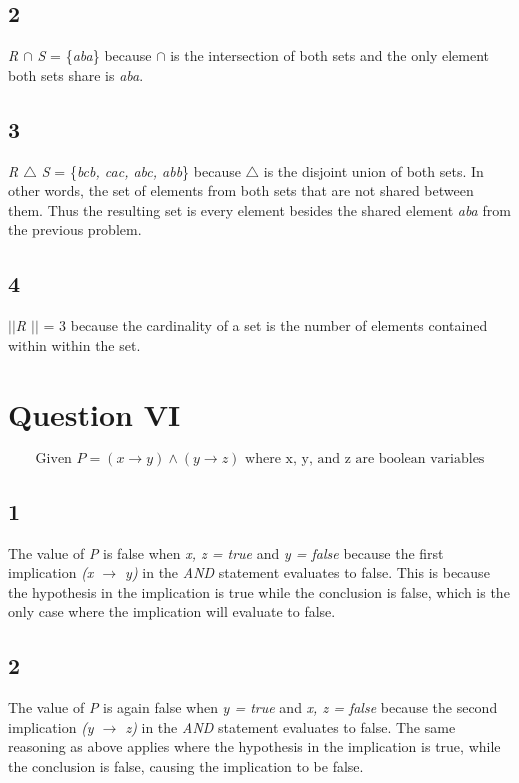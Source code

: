 \documentclass{article}
\begin{document}
\subsection{2}
\textit{R $\cap$ S} = \{\textit{aba}\} because $\cap$ is the intersection of both sets and the only element both sets share is \textit{aba}.

\subsection{3}
\textit{R $\triangle$ S} = \{\textit{bcb, cac, abc, abb}\} because $\triangle$ is the disjoint union of both sets. In other words, the set of elements from both sets that are not shared between them. Thus the resulting set is every element besides the shared element \textit{aba} from the previous problem.

\subsection{4}
\textit{$\vert\vert$R $\vert\vert$} = 3 because the cardinality of a set is the number of elements contained within within the set.

\section*{Question VI}

\[ \textrm{Given } P = (x \rightarrow y) \land (y \rightarrow z) \textrm{ where x, y, and z are boolean variables}\]

\subsection{1} 
The value of \textit{P} is false when \textit{x, z = true} and \textit{y = false} because the first implication \textit{(x $\rightarrow$ y)} in the \textit{AND} statement evaluates to false. This is because the hypothesis in the implication is true while the conclusion is false, which is the only case where the implication will evaluate to false.

\subsection{2} 
The value of \textit{P} is again false when \textit{y = true} and \textit{x, z = false} because the second implication \textit{(y $\rightarrow$ z)} in the \textit{AND} statement evaluates to false. The same reasoning as above applies where the hypothesis in the implication is true, while the conclusion is false, causing the implication to be false.
\end{document}
